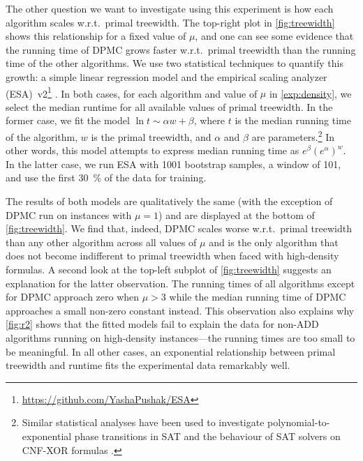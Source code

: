 The other question we want to investigate using this experiment is how each
algorithm scales w.r.t.\ primal treewidth. The top-right plot in
\cref{fig:treewidth} shows this relationship for a fixed value of $\mu$, and one
can see some evidence that the running time of \textsc{DPMC} grows faster
w.r.t.\ primal treewidth than the running time of the other algorithms. We use
two statistical techniques to quantify this growth: a simple linear regression
model and the empirical scaling analyzer
(ESA)~v2\footnote{\url{https://github.com/YashaPushak/ESA}}
\citep{DBLP:conf/gecco/PushakH20}. In both cases, for each algorithm and value
of $\mu$ in \cref{exp:density}, we select the median runtime for all available
values of primal treewidth. In the former case, we fit the model
$\ln t \sim \alpha w + \beta$, where $t$ is the median running time of the
algorithm, $w$ is the primal treewidth, and $\alpha$ and $\beta$ are
parameters.\footnote{Similar statistical analyses have been used to investigate
  polynomial-to-exponential phase transitions in SAT
  \citep{DBLP:journals/constraints/CoarfaDASV03} and the behaviour of SAT
  solvers on CNF-XOR formulas \citep{DBLP:conf/ijcai/DudekMV17}.} In other
words, this model attempts to express median running time as
$e^\beta{(e^\alpha)}^w$. In the latter case, we run ESA with 1001 bootstrap
samples, a window of 101, and use the first \SI{30}{\percent} of the data for
training.

The results of both models are qualitatively the same (with the exception of
\textsc{DPMC} run on instances with $\mu = 1$) and are displayed at the bottom
of \cref{fig:treewidth}. We find that, indeed, \textsc{DPMC} scales worse
w.r.t.\ primal treewidth than any other algorithm across all values of $\mu$ and
is the only algorithm that does not become indifferent to primal treewidth when
faced with high-density formulas. A second look at the top-left subplot of
\cref{fig:treewidth} suggests an explanation for the latter observation. The
running times of all algorithms except for \textsc{DPMC} approach zero when
$\mu > 3$ while the median running time of \textsc{DPMC} approaches a small
non-zero constant instead. This observation also explains why \cref{fig:r2}
shows that the fitted models fail to explain the data for non-ADD algorithms
running on high-density instances---the running times are too small to be
meaningful. In all other cases, an exponential relationship between primal
treewidth and runtime fits the experimental data remarkably well.

